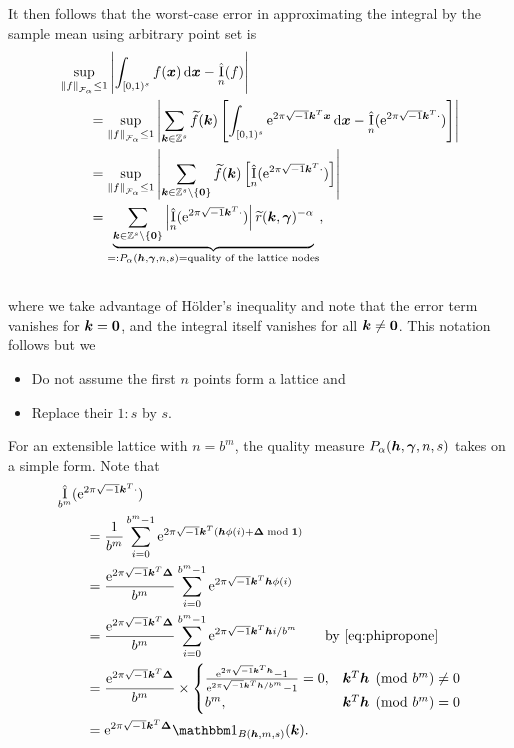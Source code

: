 \documentclass[authoryear]{elsarticle}
\newcommand{\tr}{\widetilde{r}}
\newcommand{\appxintn}{\appxint_n}
\DeclareMathOperator{\appxint}{\hat{I}}
\newcommand{\onetos}{1\!:\!s}
\begin{document}
It then follows that the worst-case error in approximating the integral by the sample mean using arbitrary point set is
\begin{align} \label{eq:wcerrPalpha}
\nonumber
\MoveEqLeft{\sup_{\norm[\cf_{\alpha}]{f} \le 1} \abs{\int_{[0,1)^{s}} f(\vx) \, \dif \vx - \appxint_n(f)}} \\
&
\nonumber
= \sup_{\norm[\cf_{\alpha}]{f} \le 1} \abs{\sum_{\vk \in \integers^{s}} \tf(\vk) \left[\int_{[0,1)^{s}} \me^{2 \pi \sqrt{-1} \vk^T \vx} \, \dif \vx - \appxintn(\me^{2 \pi \sqrt{-1} \vk^T \cdot})\right]} \\
& \nonumber= \sup_{\norm[\cf_{\alpha}]{f} \le 1} \abs{\sum_{\vk \in \integers^s \setminus\{\vzero\}} \tf(\vk) \left[ \appxintn(\me^{2 \pi \sqrt{-1} \vk^T \cdot})\right]} \\
& = \underbrace{\sum_{\vk \in \integers^s \setminus\{\vzero\}} \abs{\appxint_n(\me^{2 \pi \sqrt{-1} \vk^T \cdot})}\tr(\vk,\vgamma)^{-\alpha}}_{=: P_\alpha(\vh,\vgamma,n,s) = \text{quality of the lattice nodes}}, \\
\nonumber\end{align}
where we take advantage of H\"older's inequality and note that the error term vanishes for $\boldsymbol{k} = \boldsymbol{0}$, and the integral itself vanishes for all $\boldsymbol{k} \ne \boldsymbol{0}$.
This notation follows \cite[(4)]{HicNie03a} but we 
\begin{itemize}
    \item Do not assume the first $n$ points form a lattice and
    \item Replace their $\onetos$ by $s$.
\end{itemize}
For an extensible lattice with $n = b^m$, the quality measure $P_\alpha(\boldsymbol{h},\boldsymbol{\gamma},n, s)$ takes on a simple form.  Note that
\begin{align*}\label{Eq:DualLattice}
    \MoveEqLeft{\appxint_{b^m}(\me^{2 \pi \sqrt{-1} \vk^T \cdot})} \\
    \nonumber
    &= \frac 1{b^m} \sum_{i=0}^{b^m-1} \me^{2 \pi \sqrt{-1} \vk^T (\vh\phi(i) + \vDelta \bmod{\vone})} \\
    \nonumber
    &= \frac {\me^{2 \pi \sqrt{-1} \vk^T \vDelta}}{b^m} \sum_{i=0}^{b^m-1} \me^{2 \pi \sqrt{-1} \vk^T \vh\phi(i)} \\
    \nonumber
    &= \frac {\me^{2 \pi \sqrt{-1} \vk^T \vDelta}}{b^m} \sum_{i=0}^{b^m-1} \me^{2 \pi \sqrt{-1} \vk^T \vh i/b^m} \qquad \text{by \eqref{eq:phipropone}}\\
    \nonumber
    &= \frac {\me^{2 \pi \sqrt{-1} \vk^T \vDelta}}{b^m} \times
    \begin{cases}
    \frac{\me^{2 \pi \sqrt{-1} \vk^T \vh} - 1}{\me^{2 \pi \sqrt{-1} \vk^T \vh/b^m} - 1} = 0, & \vk^T \vh \pmod{b^m} \ne 0\\
    b^m, & \vk^T \vh \pmod{b^m} = 0
    \end{cases} \\
    \nonumber
    & = \me^{2 \pi \sqrt{-1} \vk^T \vDelta} \bbone_{B(\vh,m,s)}(\vk).
\end{align*}
\end{document}
